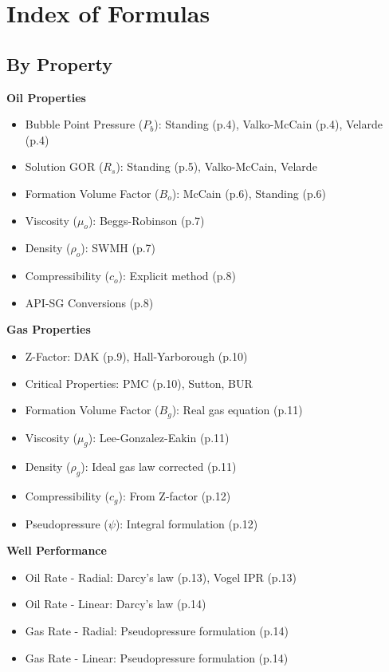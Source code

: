 \documentclass[11pt,a4paper]{article}
\begin{document}
\newpage

\section{Index of Formulas}

\subsection{By Property}

\textbf{Oil Properties}
\begin{itemize}
\item Bubble Point Pressure ($P_b$): Standing (p.4), Valko-McCain (p.4), Velarde (p.4)
\item Solution GOR ($R_s$): Standing (p.5), Valko-McCain, Velarde
\item Formation Volume Factor ($B_o$): McCain (p.6), Standing (p.6)
\item Viscosity ($\mu_o$): Beggs-Robinson (p.7)
\item Density ($\rho_o$): SWMH (p.7)
\item Compressibility ($c_o$): Explicit method (p.8)
\item API-SG Conversions (p.8)
\end{itemize}

\textbf{Gas Properties}
\begin{itemize}
\item Z-Factor: DAK (p.9), Hall-Yarborough (p.10)
\item Critical Properties: PMC (p.10), Sutton, BUR
\item Formation Volume Factor ($B_g$): Real gas equation (p.11)
\item Viscosity ($\mu_g$): Lee-Gonzalez-Eakin (p.11)
\item Density ($\rho_g$): Ideal gas law corrected (p.11)
\item Compressibility ($c_g$): From Z-factor (p.12)
\item Pseudopressure ($\psi$): Integral formulation (p.12)
\end{itemize}

\textbf{Well Performance}
\begin{itemize}
\item Oil Rate - Radial: Darcy's law (p.13), Vogel IPR (p.13)
\item Oil Rate - Linear: Darcy's law (p.14)
\item Gas Rate - Radial: Pseudopressure formulation (p.14)
\item Gas Rate - Linear: Pseudopressure formulation (p.14)
\end{itemize}
\end{document}

